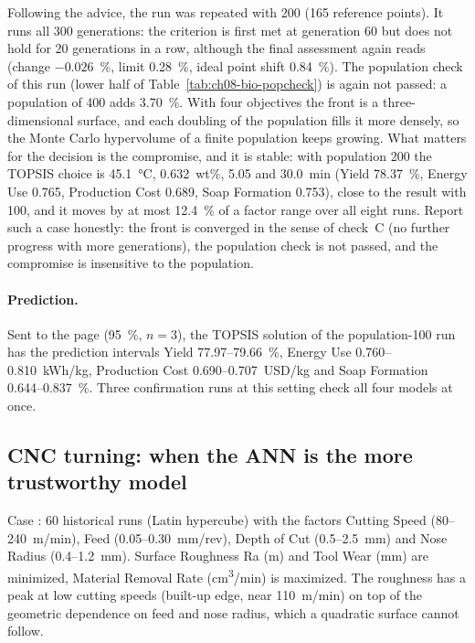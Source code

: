 Following the advice, the run was repeated with  200 (165 reference points). It runs all 300
generations: the criterion is first met at generation 60 but does not hold for 20 generations in a row, although the
final assessment again reads  (change $-0.026$~\%, limit 0.28~\%, ideal point shift 0.84~\%).
The population check of this run (lower half of Table~\ref{tab:ch08-bio-popcheck}) is again not passed: a population of
400 adds 3.70~\%. With four objectives the front is a three-dimensional surface, and each doubling of the population
fills it more densely, so the Monte Carlo hypervolume of a finite population keeps growing. What matters for the
decision is the compromise, and it is stable: with population 200 the TOPSIS choice is 45.1~°C, 0.632~wt\%, 5.05 and
30.0~min (Yield 78.37~\%, Energy Use 0.765, Production Cost 0.689, Soap Formation 0.753), close to the result with 100,
and it moves by at most 12.4~\% of a factor range over all eight runs. Report such a case honestly: the front
is converged in the sense of check~C (no further progress with more generations), the population check is not passed,
and the compromise is insensitive to the population.

\paragraph{Prediction.} Sent to the  page (95~\%, $n=3$), the TOPSIS solution of the
population-100 run has the prediction intervals Yield 77.97--79.66~\%, Energy Use 0.760--0.810~kWh/kg, Production Cost
0.690--0.707~USD/kg and Soap Formation 0.644--0.837~\%. Three confirmation runs at this setting check all four models
at once.

\subsection{CNC turning: when the ANN is the more trustworthy model}
\label{sec:ch08-turning}
Case : 60 historical runs (Latin hypercube) with the factors Cutting Speed
(80--240~m/min), Feed (0.05--0.30~mm/rev), Depth of Cut (0.5--2.5~mm) and Nose Radius (0.4--1.2~mm). Surface Roughness
Ra (\textmu m) and Tool Wear (mm) are minimized, Material Removal Rate (cm\textsuperscript{3}/min) is maximized. The
roughness has a peak at low cutting speeds (built-up edge, near 110~m/min) on top of the geometric dependence on feed
and nose radius, which a quadratic surface cannot follow.

